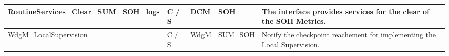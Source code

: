 \begin{longtable}{|l|l|l|l|l|}
\begin{minipage}{0.39\linewidth}\raggedright\vspace{.75ex}RoutineServices\_Clear\_SUM\_SOH\_logs\vspace{.75ex}\end{minipage} & \begin{minipage}{0.07\linewidth}\raggedright\vspace{.75ex}C / S\vspace{.75ex}\end{minipage} & \begin{minipage}{0.11\linewidth}\raggedright\vspace{.75ex}DCM\vspace{.75ex}\end{minipage} & \begin{minipage}{0.11\linewidth}\raggedright\vspace{.75ex}SOH\vspace{.75ex}\end{minipage} & \begin{minipage}{0.16\linewidth}\raggedright\vspace{.75ex}The interface provides services for the clear of the SOH Metrics.\vspace{.75ex}\end{minipage}\\\hline
\begin{minipage}{0.39\linewidth}\raggedright\vspace{.75ex}WdgM\_LocalSupervision\vspace{.75ex}\end{minipage} & \begin{minipage}{0.07\linewidth}\raggedright\vspace{.75ex} C / S\vspace{.75ex}\end{minipage} & \begin{minipage}{0.11\linewidth}\raggedright\vspace{.75ex}WdgM\vspace{.75ex}\end{minipage} & \begin{minipage}{0.11\linewidth}\raggedright\vspace{.75ex}SUM\_SOH\vspace{.75ex}\end{minipage} & \begin{minipage}{0.16\linewidth}\raggedright\vspace{.75ex}Notify the checkpoint reachement for implementing the Local Supervision.\vspace{.75ex}\end{minipage}\\\hline

\end{longtable}
